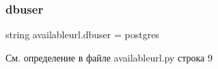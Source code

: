 \mbox{\label{namespaceavailableurl_a7aad22fecf6c516bded3d3c0a571bd40}} 
\subsubsection{\texorpdfstring{dbuser}{dbuser}}
{\footnotesize\ttfamily string availableurl.\+dbuser = \textquotesingle{}postgres\textquotesingle{}}



См. определение в файле availableurl.\+py строка 9

